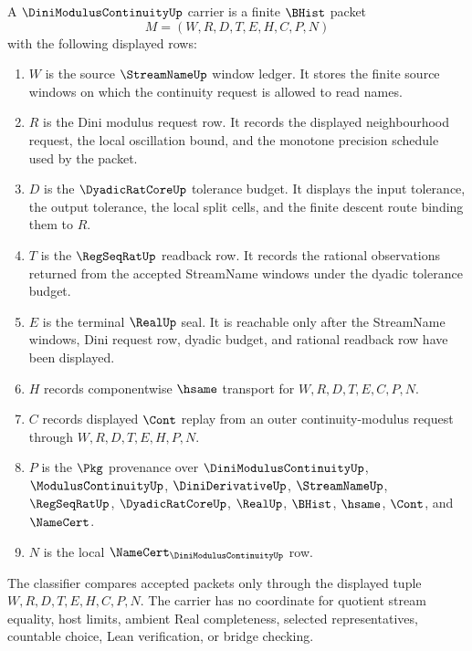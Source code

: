 \begin{definition}\label{def:dini-modulus-continuity-carrier}
A $\DiniModulusContinuityUp$ carrier is a finite $\BHist$ packet
$$
M=(W,R,D,T,E,H,C,P,N)
$$
with the following displayed rows:
\begin{enumerate}
\item $W$ is the source $\StreamNameUp$ window ledger. It stores the finite source windows on which the continuity request is allowed to read names.
\item $R$ is the Dini modulus request row. It records the displayed neighbourhood request, the local oscillation bound, and the monotone precision schedule used by the packet.
\item $D$ is the $\DyadicRatCoreUp$ tolerance budget. It displays the input tolerance, the output tolerance, the local split cells, and the finite descent route binding them to $R$.
\item $T$ is the $\RegSeqRatUp$ readback row. It records the rational observations returned from the accepted StreamName windows under the dyadic tolerance budget.
\item $E$ is the terminal $\RealUp$ seal. It is reachable only after the StreamName windows, Dini request row, dyadic budget, and rational readback row have been displayed.
\item $H$ records componentwise $\hsame$ transport for $W,R,D,T,E,C,P,N$.
\item $C$ records displayed $\Cont$ replay from an outer continuity-modulus request through $W,R,D,T,E,H,P,N$.
\item $P$ is the $\Pkg$ provenance over $\DiniModulusContinuityUp$, $\ModulusContinuityUp$, $\DiniDerivativeUp$, $\StreamNameUp$, $\RegSeqRatUp$, $\DyadicRatCoreUp$, $\RealUp$, $\BHist$, $\hsame$, $\Cont$, and $\NameCert$.
\item $N$ is the local $\NameCert_{\DiniModulusContinuityUp}$ row.
\end{enumerate}
The classifier compares accepted packets only through the displayed tuple $W,R,D,T,E,H,C,P,N$. The carrier has no coordinate for quotient stream equality, host limits, ambient Real completeness, selected representatives, countable choice, Lean verification, or bridge checking.
\end{definition}

